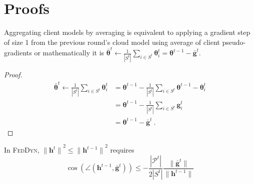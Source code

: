 \documentclass[runningheads]{llncs}
\def\vtheta{{\bm{\theta}}}
\def\vg{{\bm{g}}}
\def\vh{{\bm{h}}}
\def\gP{{\mathcal{P}}}
\newcommand*\mean[1]{\bar{#1}}
\newcommand{\feddyn}{\textsc{FedDyn}\xspace}
\begin{document}
\section{Proofs}

\begin{remark}
Aggregating client models by averaging is equivalent to applying a gradient step of size 1 from the previous round's cloud model using average of client pseudo-gradients or mathematically it is $\bar{\vtheta}^t \leftarrow \frac{1}{|S^t|} \sum_{i\in S^t} \vtheta_i^t = \vtheta^{t-1} - \bar{\vg}^t$.
\end{remark}
\begin{proof}
\begin{equation*}
\begin{split}
    \bar{\vtheta}^t \leftarrow \frac{1}{|S^t|} \sum_{i\in S^t} \vtheta_i^t & = \vtheta^{t-1}- \frac{1}{|S^t|} \sum_{i\in S^t} \vtheta^{t-1} - \vtheta_i^t \\
    & = \vtheta^{t-1}-\frac{1}{|S^t|} \sum_{i\in S^t} \vg_i^t\\ & = \vtheta^{t-1} - \bar{\vg}^t
     \ .
\end{split}
\end{equation*}
\end{proof}



\vspace{0.6cm}
\begin{theorem}
In \feddyn, ${\|\vh^t\|}^2 \leq {\|\vh^{t-1}\|}^2$ requires
\begin{equation*}
\cos( \angle (\vh^{t-1}, \mean{\vg}^{t})) \leq - \frac{|\gP^t|}{2|S^t|} \frac{\|\mean{\vg}^{t}\|}{\|{\vh}^{t-1}\|}
\end{equation*}

\end{theorem}
\end{document}
